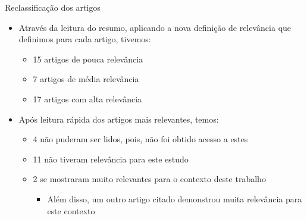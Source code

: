 \documentclass[brazilian]{beamer}
\begin{document}
\begin{frame}{Reclassificação dos artigos}
    \begin{itemize}
        \item Através da leitura do resumo, aplicando a nova definição de relevância que definimos para cada artigo, tivemos:
        \begin{itemize}
            \item 15 artigos de pouca relevância
            \item 7 artigos de média relevância
            \item 17 artigos com alta relevância
        \end{itemize}
        \item Após leitura rápida dos artigos mais relevantes, temos:
        \begin{itemize}
            \item 4 não puderam ser lidos, pois, não foi obtido acesso a estes
            \item 11 não tiveram relevância para este estudo
            \item 2 se mostraram muito relevantes para o contexto deste trabalho
            \begin{itemize}
                \item Além disso, um outro artigo citado demonstrou muita relevância para este contexto
            \end{itemize}
        \end{itemize}
    \end{itemize}
\end{frame}
\end{document}
